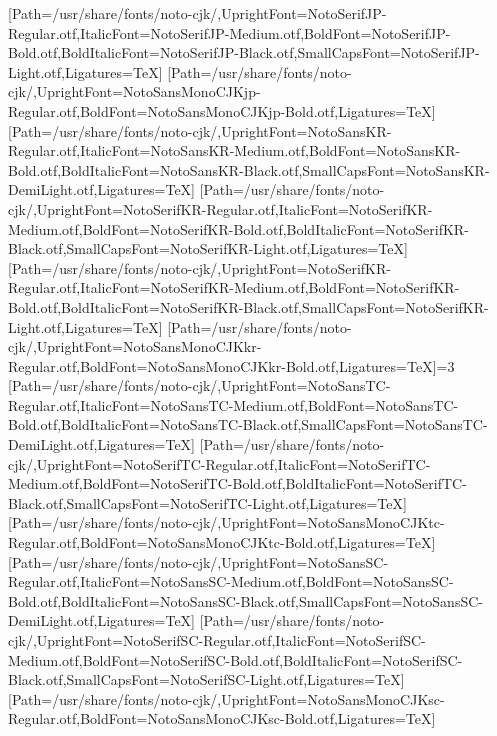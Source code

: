 \newfontfamily{}[Path=/usr/share/fonts/noto-cjk/,UprightFont=NotoSerifJP-Regular.otf,ItalicFont=NotoSerifJP-Medium.otf,BoldFont=NotoSerifJP-Bold.otf,BoldItalicFont=NotoSerifJP-Black.otf,SmallCapsFont=NotoSerifJP-Light.otf,Ligatures=TeX]
\newfontfamily{}[Path=/usr/share/fonts/noto-cjk/,UprightFont=NotoSansMonoCJKjp-Regular.otf,BoldFont=NotoSansMonoCJKjp-Bold.otf,Ligatures=TeX]
\newfontfamily{}[Path=/usr/share/fonts/noto-cjk/,UprightFont=NotoSansKR-Regular.otf,ItalicFont=NotoSansKR-Medium.otf,BoldFont=NotoSansKR-Bold.otf,BoldItalicFont=NotoSansKR-Black.otf,SmallCapsFont=NotoSansKR-DemiLight.otf,Ligatures=TeX]
\newfontfamily{}[Path=/usr/share/fonts/noto-cjk/,UprightFont=NotoSerifKR-Regular.otf,ItalicFont=NotoSerifKR-Medium.otf,BoldFont=NotoSerifKR-Bold.otf,BoldItalicFont=NotoSerifKR-Black.otf,SmallCapsFont=NotoSerifKR-Light.otf,Ligatures=TeX]
\newfontfamily{}[Path=/usr/share/fonts/noto-cjk/,UprightFont=NotoSerifKR-Regular.otf,ItalicFont=NotoSerifKR-Medium.otf,BoldFont=NotoSerifKR-Bold.otf,BoldItalicFont=NotoSerifKR-Black.otf,SmallCapsFont=NotoSerifKR-Light.otf,Ligatures=TeX]
\newfontfamily{}[Path=/usr/share/fonts/noto-cjk/,UprightFont=NotoSansMonoCJKkr-Regular.otf,BoldFont=NotoSansMonoCJKkr-Bold.otf,Ligatures=TeX]\else\ifnum\value{NotoCJKFamily}=3
\newfontfamily{}[Path=/usr/share/fonts/noto-cjk/,UprightFont=NotoSansTC-Regular.otf,ItalicFont=NotoSansTC-Medium.otf,BoldFont=NotoSansTC-Bold.otf,BoldItalicFont=NotoSansTC-Black.otf,SmallCapsFont=NotoSansTC-DemiLight.otf,Ligatures=TeX]
\newfontfamily{}[Path=/usr/share/fonts/noto-cjk/,UprightFont=NotoSerifTC-Regular.otf,ItalicFont=NotoSerifTC-Medium.otf,BoldFont=NotoSerifTC-Bold.otf,BoldItalicFont=NotoSerifTC-Black.otf,SmallCapsFont=NotoSerifTC-Light.otf,Ligatures=TeX]
\newfontfamily{}[Path=/usr/share/fonts/noto-cjk/,UprightFont=NotoSansMonoCJKtc-Regular.otf,BoldFont=NotoSansMonoCJKtc-Bold.otf,Ligatures=TeX]
\newfontfamily{}[Path=/usr/share/fonts/noto-cjk/,UprightFont=NotoSansSC-Regular.otf,ItalicFont=NotoSansSC-Medium.otf,BoldFont=NotoSansSC-Bold.otf,BoldItalicFont=NotoSansSC-Black.otf,SmallCapsFont=NotoSansSC-DemiLight.otf,Ligatures=TeX]
\newfontfamily{}[Path=/usr/share/fonts/noto-cjk/,UprightFont=NotoSerifSC-Regular.otf,ItalicFont=NotoSerifSC-Medium.otf,BoldFont=NotoSerifSC-Bold.otf,BoldItalicFont=NotoSerifSC-Black.otf,SmallCapsFont=NotoSerifSC-Light.otf,Ligatures=TeX]
\newfontfamily{}[Path=/usr/share/fonts/noto-cjk/,UprightFont=NotoSansMonoCJKsc-Regular.otf,BoldFont=NotoSansMonoCJKsc-Bold.otf,Ligatures=TeX]
